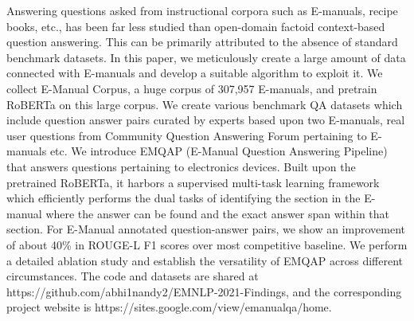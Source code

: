 Answering questions asked from instructional corpora such as E-manuals, recipe books, etc., has been far less studied than open-domain factoid context-based question answering. This can be primarily attributed to the absence of standard benchmark datasets. In this paper, we meticulously create a large amount of data connected with E-manuals and develop a suitable algorithm to exploit it. We collect E-Manual Corpus, a huge corpus of 307,957 E-manuals, and pretrain RoBERTa on this large corpus. We create various benchmark QA datasets which include question answer pairs curated by experts based upon two E-manuals,  real user questions from Community Question Answering Forum pertaining to E-manuals etc. We introduce EMQAP (E-Manual Question Answering Pipeline) that answers questions pertaining to electronics devices. Built upon the pretrained RoBERTa, it harbors a  supervised multi-task learning framework which efficiently performs the dual tasks of identifying the section in the E-manual where the answer can be found and the exact answer span within that section. For E-Manual annotated question-answer pairs, we show an improvement of about 40\% in ROUGE-L F1 scores over most competitive baseline. We perform a detailed ablation study and establish the versatility of EMQAP across different circumstances. The code and datasets are shared at https://github.com/abhi1nandy2/EMNLP-2021-Findings, and the corresponding project website is https://sites.google.com/view/emanualqa/home.
